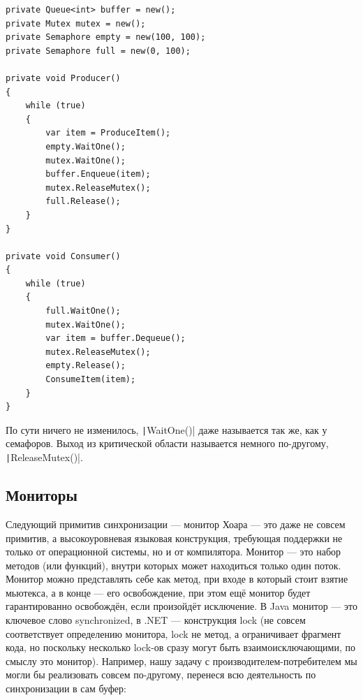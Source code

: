 \documentclass[a5paper]{article}
\begin{document}
\begin{verbatim}
private Queue<int> buffer = new();
private Mutex mutex = new();
private Semaphore empty = new(100, 100);
private Semaphore full = new(0, 100);

private void Producer()
{
    while (true)
    {
        var item = ProduceItem();
        empty.WaitOne();
        mutex.WaitOne();
        buffer.Enqueue(item);
        mutex.ReleaseMutex();
        full.Release();
    }
}

private void Consumer()
{
    while (true)
    {
        full.WaitOne();
        mutex.WaitOne();
        var item = buffer.Dequeue();
        mutex.ReleaseMutex();
        empty.Release();
        ConsumeItem(item);
    }
}
\end{verbatim}

По сути ничего не изменилось, \texttt|WaitOne()| даже называется так же, как у семафоров. Выход из критической области называется немного по-другому, \texttt|ReleaseMutex()|.

\subsection{Мониторы}

Следующий примитив синхронизации --- монитор Хоара --- это даже не совсем примитив, а высокоуровневая языковая конструкция, требующая поддержки не только от операционной системы, но и от компилятора. Монитор --- это набор методов (или функций), внутри которых может находиться только один поток. Монитор можно представлять себе как метод, при входе в который стоит взятие мьютекса, а в конце --- его освобождение, при этом ещё монитор будет гарантированно освобождён, если произойдёт исключение. В Java монитор --- это ключевое слово synchronized, в .NET --- конструкция lock (не совсем соответствует определению монитора, lock не метод, а ограничивает фрагмент кода, но поскольку несколько lock-ов сразу могут быть взаимоисключающими, по смыслу это монитор). Например, нашу задачу с производителем-потребителем мы могли бы реализовать совсем по-другому, перенеся всю деятельность по синхронизации в сам буфер:
\end{document}
